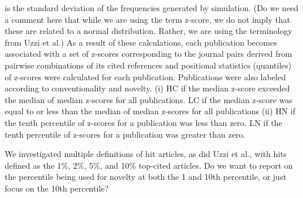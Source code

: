 \documentclass[NETN]{stjour}
\begin{document}
 is the standard deviation of the frequencies generated by simulation. (Do we need a comment here that while we are using the term z-score, we do not imply that these are related to a normal distribution. Rather, we are using the terminology from Uzzi et al.) As a result of these calculations, each publication becomes associated with a set of z-scores corresponding to the journal pairs derived from pairwise combinations of its cited references and positional statistics (quantiles) of z-scores were calculated for each publication. Publications were also labeled according to conventionality and novelty. (i) HC if the median z-score exceeded the median of median z-scores for all publications. LC if the median z-score was equal to or less than the median of median z-scores for all publications (ii) HN if the tenth percentile of z-scores for a publication was less than zero. LN if the tenth percentile of z-scores for a publication was greater than zero. 
 
We investigated multiple definitions of hit articles, as did Uzzi et al., with hits defined as the 1\%, 2\%, 5\%, and 10\% top-cited articles.  Do we want to report on the percentile being used for novelty at both the 1 and 10th percentile, or just focus on the 10th percentile?
\end{document}
